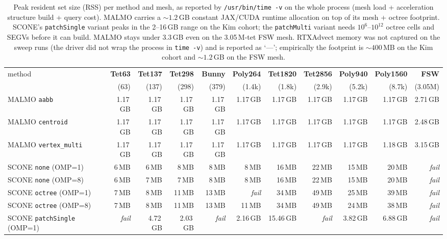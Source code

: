 \begin{table}[t]
\centering\small
\caption{Peak resident set size (RSS) per method and mesh, as reported by \texttt{/usr/bin/time~-v} on the whole process (mesh load + acceleration structure build + query cost).  MALMO carries a $\sim 1.2$\,GB constant JAX/CUDA runtime allocation on top of its mesh + octree footprint. SCONE's \texttt{patchSingle} variant peaks in the 2--16\,GB range on the Kim cohort; the \texttt{patchMulti} variant needs $10^6$--$10^{12}$ octree cells and SEGVs before it can build.  MALMO stays under 3.3\,GB even on the 3.05\,M-tet FSW mesh.  RTXAdvect memory was not captured on the sweep runs (the driver did not wrap the process in \texttt{time~-v}) and is reported as `---'; empirically the footprint is $\sim 400$\,MB on the Kim cohort and $\sim 1.2$\,GB on the FSW mesh.}
\label{tab:r26-mem}
\begin{tabular}{lrrrrrrrrrr}
\toprule
method & \textbf{Tet63} & \textbf{Tet137} & \textbf{Tet298} & \textbf{Bunny} & \textbf{Poly264} & \textbf{Tet1820} & \textbf{Tet2856} & \textbf{Poly940} & \textbf{Poly1560} & \textbf{FSW} \\
 & (63) & (137) & (298) & (379) & (1.4k) & (1.8k) & (2.9k) & (5.2k) & (8.7k) & (3.05M) \\
\midrule
MALMO \texttt{aabb} & 1.17\,GB & 1.17\,GB & 1.17\,GB & 1.17\,GB & 1.17\,GB & 1.17\,GB & 1.17\,GB & 1.17\,GB & 1.17\,GB & 2.71\,GB \\
MALMO \texttt{centroid} & 1.17\,GB & 1.17\,GB & 1.17\,GB & 1.17\,GB & 1.17\,GB & 1.17\,GB & 1.17\,GB & 1.17\,GB & 1.17\,GB & 2.48\,GB \\
MALMO \texttt{vertex\_multi} & 1.17\,GB & 1.17\,GB & 1.17\,GB & 1.17\,GB & 1.17\,GB & 1.17\,GB & 1.17\,GB & 1.17\,GB & 1.18\,GB & 3.15\,GB \\
\midrule
SCONE \texttt{none} (OMP=1) & 6\,MB & 6\,MB & 8\,MB & 8\,MB & 8\,MB & 16\,MB & 22\,MB & 15\,MB & 20\,MB & \textit{fail} \\
SCONE \texttt{none} (OMP=8) & 6\,MB & 7\,MB & 7\,MB & 8\,MB & 8\,MB & 16\,MB & 22\,MB & 15\,MB & 20\,MB & \textit{fail} \\
SCONE \texttt{octree} (OMP=1) & 7\,MB & 8\,MB & 11\,MB & 13\,MB & \textit{fail} & 34\,MB & 49\,MB & 25\,MB & 39\,MB & \textit{fail} \\
SCONE \texttt{octree} (OMP=8) & 7\,MB & 8\,MB & 11\,MB & 13\,MB & 11\,MB & 34\,MB & 49\,MB & 24\,MB & 38\,MB & \textit{fail} \\
SCONE \texttt{patchSingle} (OMP=1) & \textit{fail} & 4.72\,GB & 2.03\,GB & \textit{fail} & 2.16\,GB & 15.46\,GB & \textit{fail} & 3.82\,GB & 6.88\,GB & \textit{fail} \\

\end{tabular}
\end{table}
